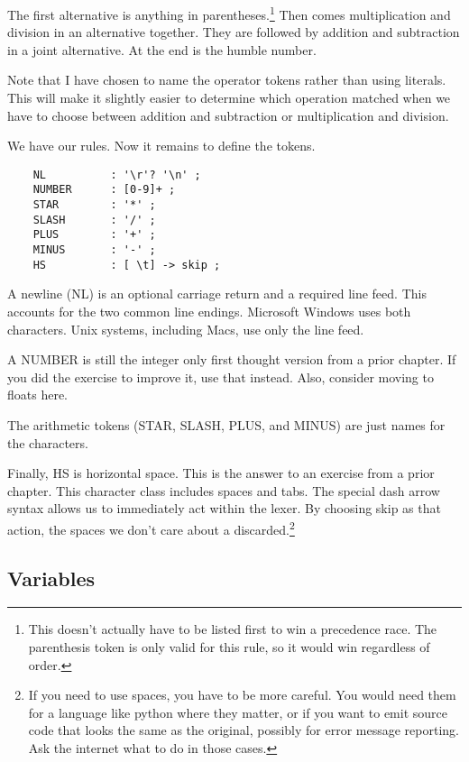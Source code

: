 The first alternative is anything in parentheses.\footnote{This doesn't
actually have to be listed first to win a precedence race. The parenthesis
token is only valid for this rule, so it would win regardless of order.}
Then comes multiplication and division in an alternative together.
They are followed by addition and subtraction in a joint alternative.
At the end is the humble number.

Note that I have chosen to name the operator tokens rather than using
literals. This will make it slightly easier to determine which operation
matched when we have to choose between addition and subtraction or
multiplication and division.

We have our rules. Now it remains to define the tokens.

{\footnotesize
\begin{verbatim}
    NL          : '\r'? '\n' ;
    NUMBER      : [0-9]+ ;
    STAR        : '*' ;
    SLASH       : '/' ;
    PLUS        : '+' ;
    MINUS       : '-' ;
    HS          : [ \t] -> skip ;
\end{verbatim}
}

A newline (NL) is an optional carriage return and a required line feed. This
accounts for the two common line endings. Microsoft Windows uses both
characters. Unix systems, including Macs, use only the line feed.

A NUMBER is still the integer only first thought version from a prior
chapter. If you did the exercise to improve it, use that instead.
Also, consider moving to floats here.

The arithmetic tokens (STAR, SLASH, PLUS, and MINUS) are just names for
the characters.

Finally, HS is horizontal space. This is the answer to an exercise
from a prior chapter. This character class includes spaces and tabs.
The special dash arrow syntax allows us to immediately act within the
lexer. By choosing skip as that action, the spaces we don't care about
a discarded.\footnote{If you need to use spaces, you have to be more
careful. You would need them for a language like python where they matter,
or if you want to emit source code that looks the same as the original,
possibly for error message reporting. Ask the internet what to do in
those cases.}

\subsection{Variables}

